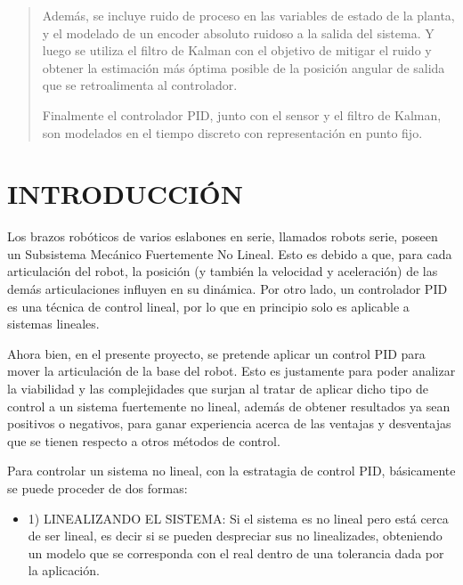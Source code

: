 \documentclass{article}
\begin{document}
\begin{sloppypar}
\begin{abstract}
    Además, se incluye ruido de proceso en las variables de estado de la planta, y el modelado de un encoder absoluto ruidoso a la salida del sistema. Y luego se utiliza el filtro de Kalman con el objetivo de mitigar el ruido y obtener la estimación más óptima posible de la posición angular de salida que se retroalimenta al controlador.

    Finalmente el controlador PID, junto con el sensor y el filtro de Kalman, son modelados en el tiempo discreto con representación en punto fijo.
\end{abstract}



\section{INTRODUCCIÓN}
\label{sec:INTRODUCCIÓN}

Los brazos robóticos de varios eslabones en serie, llamados robots serie, poseen un Subsistema Mecánico Fuertemente No Lineal. Esto es debido a que, para cada articulación del robot, la posición (y también la velocidad y aceleración) de las demás articulaciones influyen en su dinámica.
Por otro lado, un controlador PID es una técnica de control lineal, por lo que en principio solo es aplicable a sistemas lineales.

Ahora bien, en el presente proyecto, se pretende aplicar un control PID para mover la articulación de la base del robot. Esto es justamente para poder analizar la viabilidad y las complejidades que surjan al tratar de aplicar dicho tipo de control a un sistema fuertemente no lineal, además de obtener resultados ya sean positivos o negativos, para ganar experiencia acerca de las ventajas y desventajas que se tienen respecto a otros métodos de control.

Para controlar un sistema no lineal, con la estratagia de control PID, básicamente se puede proceder de dos formas:

\begin{itemize}
    \item 1) LINEALIZANDO EL SISTEMA: Si el sistema es no lineal pero está cerca de ser lineal, es decir si se pueden despreciar sus no linealizades, obteniendo un modelo que se corresponda con el real dentro de una tolerancia dada por la aplicación.


\end{itemize}
\end{sloppypar}
\end{document}

